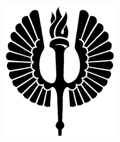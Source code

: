 
\begin{titlepage}

\begin{addmargin}[-1cm]{-3cm}
\begin{center}
\large

\hfill
\vfill

\begingroup
\color{Maroon}\spacedallcaps{\myTitle} \\ \bigskip %
\endgroup

\spacedlowsmallcaps{\myName} %

\vfill

\includegraphics[width=6cm]{gfx/uni_logo} \\ \medskip %

\mySubtitle \\ \medskip %
\myDegree \\
\myDepartment \\
\myFaculty \\
\myUni \\ \bigskip

\myTime%

\vfill

\end{center}
\end{addmargin}

\end{titlepage}
